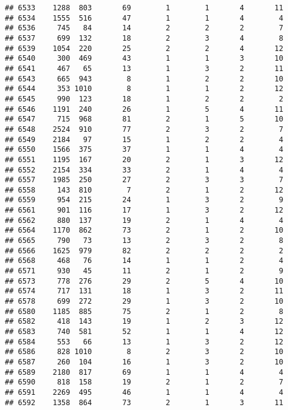 \documentclass[]{article}
\begin{document}
\begin{verbatim}
## 6533    1288  803       69        1        1       4       11
## 6534    1555  516       47        1        1       4        4
## 6536     745   84       14        2        2       2        7
## 6537     699  132       18        2        3       4        8
## 6539    1054  220       25        2        2       4       12
## 6540     300  469       43        1        1       3       10
## 6541     467   65       13        1        3       2       11
## 6543     665  943        8        1        2       2       10
## 6544     353 1010        8        1        1       2       12
## 6545     990  123       18        1        2       2        2
## 6546    1191  240       26        1        5       4       11
## 6547     715  968       81        2        1       5       10
## 6548    2524  910       77        2        3       2        7
## 6549    2184   97       15        1        2       2        4
## 6550    1566  375       37        1        1       4        4
## 6551    1195  167       20        2        1       3       12
## 6552    2154  334       33        2        1       4        4
## 6557    1985  250       27        2        3       3        7
## 6558     143  810        7        2        1       2       12
## 6559     954  215       24        1        3       2        9
## 6561     901  116       17        1        3       2       12
## 6562     880  137       19        2        1       4        4
## 6564    1170  862       73        2        1       2       10
## 6565     790   73       13        2        3       2        8
## 6566    1625  979       82        2        2       2        2
## 6568     468   76       14        1        1       2        4
## 6571     930   45       11        2        1       2        9
## 6573     778  276       29        2        5       4       10
## 6574     717  131       18        1        3       2       11
## 6578     699  272       29        1        3       2       10
## 6580    1185  885       75        2        1       2        8
## 6582     418  143       19        1        2       3       12
## 6583     740  581       52        1        1       4       12
## 6584     553   66       13        1        3       2       12
## 6586     828 1010        8        2        3       2       10
## 6587     260  104       16        1        3       2       10
## 6589    2180  817       69        1        1       4        4
## 6590     818  158       19        2        1       2        7
## 6591    2269  495       46        1        1       4        4
## 6592    1358  864       73        2        1       3       11

\end{verbatim}
\end{document}
